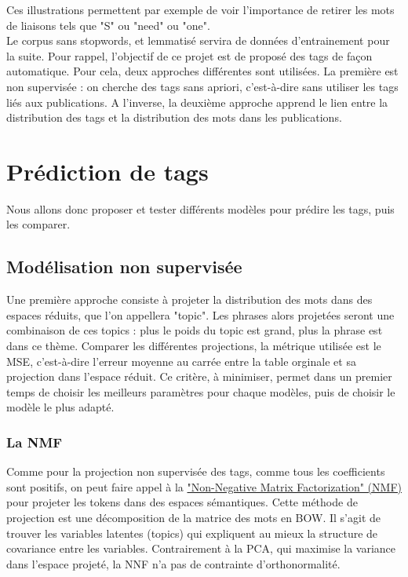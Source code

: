 \documentclass[a4paper,11pt]{article}
\begin{document}
Ces illustrations permettent par exemple de voir l'importance de retirer les mots de liaisons tels que "S" ou "need" ou "one". \\

Le corpus sans stopwords, et lemmatisé servira de données d'entrainement pour la suite. Pour rappel, l'objectif de ce projet est de proposé des tags de façon automatique. Pour cela, deux approches différentes sont utilisées. La première est non supervisée : on cherche des tags sans apriori, c'est-à-dire sans utiliser les tags liés aux publications. A l'inverse, la deuxième approche apprend le lien entre la distribution des tags et la distribution des mots dans les publications.
    
\section{Prédiction de tags}
Nous allons donc proposer et tester différents modèles pour prédire les tags, puis les comparer.

\subsection{Modélisation non supervisée}

Une première approche consiste à projeter la distribution des mots dans des espaces réduits, que l'on appellera "topic". Les phrases alors projetées seront une combinaison de ces topics : plus le poids du topic est grand, plus la phrase est dans ce thème. Comparer les différentes projections, la métrique utilisée est le MSE, c'est-à-dire l'erreur moyenne au carrée entre la table orginale et sa projection dans l'espace réduit. Ce critère, à minimiser, permet dans un premier temps de choisir les meilleurs paramètres pour chaque modèles, puis de choisir le modèle le plus adapté.

\subsubsection*{La NMF}
Comme pour la projection non supervisée des tags, comme tous les coefficients sont positifs, on peut faire appel à la {\color{blue} \href{https://en.wikipedia.org/wiki/Non-negative_matrix_factorization}{"Non-Negative Matrix Factorization" (NMF)}} pour projeter les tokens dans des espaces sémantiques. Cette méthode de projection est une décomposition de la matrice des mots en BOW. Il s'agit de trouver les variables latentes (topics) qui expliquent au mieux la structure de covariance entre les variables. Contrairement à la PCA, qui maximise la variance dans l'espace projeté, la NNF n'a pas de contrainte d'orthonormalité. \\
\end{document}
